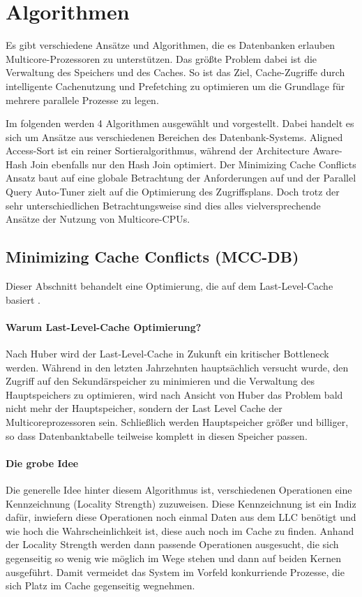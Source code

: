 \chapter{Algorithmen}
\label{sec:Algorithmen}
Es gibt verschiedene Ansätze und Algorithmen, die es Datenbanken erlauben Multicore-Prozessoren zu unterstützen. Das größte Problem dabei ist die Verwaltung des Speichers und des Caches. So ist das Ziel, Cache-Zugriffe durch intelligente Cachenutzung und Prefetching zu optimieren um die Grundlage für mehrere parallele Prozesse zu legen.

Im folgenden werden 4 Algorithmen ausgewählt und vorgestellt. Dabei handelt es sich um Ansätze aus verschiedenen Bereichen des Datenbank-Systems. Aligned Access-Sort ist ein reiner Sortieralgorithmus, während der Architecture Aware-Hash Join ebenfalls nur den Hash Join optimiert. Der Minimizing Cache Conflicts Ansatz baut auf eine globale Betrachtung der Anforderungen auf und der Parallel Query Auto-Tuner zielt auf die Optimierung des Zugriffsplans. Doch trotz der sehr unterschiedlichen Betrachtungsweise sind dies alles vielversprechende Ansätze der Nutzung von Multicore-CPUs.


\section{Minimizing Cache Conflicts (MCC-DB)}
\label{sec:MCC-DB}
Dieser Abschnitt behandelt eine Optimierung, die auf dem Last-Level-Cache basiert \cite{LEE}. 

\subsubsection*{Warum Last-Level-Cache Optimierung?}
Nach Huber \cite{HUBER} wird der Last-Level-Cache in Zukunft ein kritischer Bottleneck werden. Während in den letzten Jahrzehnten hauptsächlich versucht wurde, den Zugriff auf den Sekundärspeicher zu minimieren und die Verwaltung des Hauptspeichers zu optimieren, wird nach Ansicht von Huber das Problem bald nicht mehr der Hauptspeicher, sondern der Last Level Cache der Multicoreprozessoren sein. Schließlich werden Hauptspeicher größer und billiger, so dass Datenbanktabelle teilweise komplett in diesen Speicher passen.

\subsubsection*{Die grobe Idee}
Die generelle Idee hinter diesem Algorithmus ist, verschiedenen Operationen eine Kennzeichnung (Locality Strength) zuzuweisen. Diese Kennzeichnung ist ein Indiz dafür, inwiefern diese Operationen noch einmal Daten aus dem LLC benötigt und wie hoch die Wahrscheinlichkeit ist, diese auch noch im Cache zu finden. Anhand der Locality Strength werden dann passende Operationen ausgesucht, die sich gegenseitig so wenig wie möglich im Wege stehen und dann auf beiden Kernen ausgeführt. Damit vermeidet das System im Vorfeld konkurriende Prozesse, die sich Platz im Cache gegenseitig wegnehmen.

